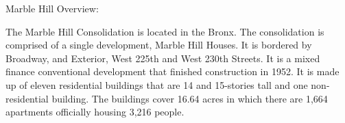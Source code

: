 Marble Hill Overview:  

   

The Marble Hill Consolidation is located in the Bronx. The consolidation is comprised of a single development, Marble Hill Houses. It is bordered by Broadway, and Exterior, West 225th and West 230th Streets. It is a mixed finance conventional development that finished construction in 1952. It is made up of eleven residential buildings that are 14 and 15-stories tall and one non-residential building. The buildings cover 16.64 acres in which there are 1,664 apartments officially housing 3,216 people.